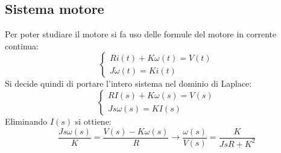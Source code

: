 \documentclass{report}
\begin{document}
\subsection{Sistema motore}
Per poter studiare il motore si fa uso delle formule del motore in corrente continua:
\begin{equation}
  \begin{cases}
    Ri(t)+K\omega(t)=V(t)\\
    J\dot \omega(t)=Ki(t)
  \end{cases}
\end{equation}
Si decide quindi di portare l'intero sistema nel dominio di Laplace:
\begin{equation}
  \begin{cases}
    RI(s)+K\omega(s)=V(s)\\
    Js\omega(s)=KI(s)    
  \end{cases}
\end{equation}
Eliminando $I(s)$ si ottiene:
\begin{equation}
  \frac{Js\omega(s)}{K}=\frac{V(s)-K\omega(s)}{R}\longrightarrow\frac{\omega(s)}{V(s)}=\frac{K}{JsR+K^2}
\end{equation}
\end{document}
